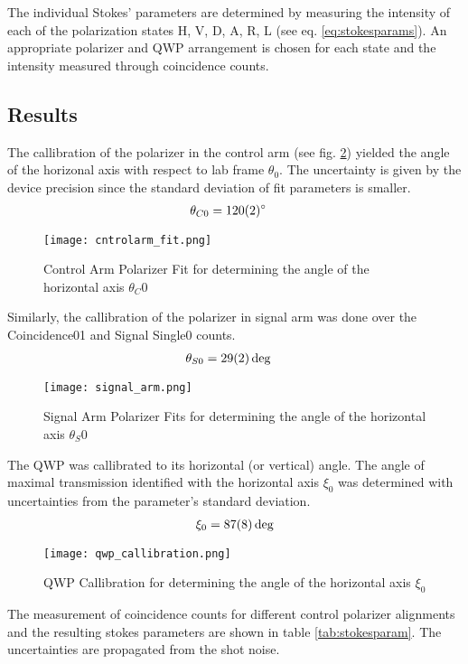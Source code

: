 \documentclass[12pt,a4paper]{article} %
\begin{document}
The individual Stokes' parameters are determined by measuring the intensity of each of the polarization states H, V, D, A, R, L (see eq. \ref{eq:stokesparams}). An appropriate polarizer and QWP arrangement is chosen for each state and the intensity measured through coincidence counts. 

\subsection{Results}
The callibration of the polarizer in the control arm (see fig. \ref{fig:control_cos_squared}) yielded the angle of the horizonal axis with respect to lab frame $\theta_0$. The uncertainty is given by the device precision since the standard deviation of fit parameters is smaller.
\begin{align*}
    \theta_{C0} &= \qty{120 \pm 2}{\degree}
\end{align*}
\begin{figure}[h]
    \centering
    \texttt{[image: cntrolarm\_fit.png]}
    \caption{Control Arm Polarizer Fit for determining the angle of the horizontal axis $\theta_C0$}
    \label{fig:control_cos_squared}
\end{figure}
Similarly, the callibration of the polarizer in signal arm was done over the Coincidence01 and Signal Single0 counts.
\begin{align*}
    \theta_{S0} &= \qty{29 \pm 2}{\deg}
\end{align*}
\begin{figure}[h]
    \centering
    \texttt{[image: signal\_arm.png]}
    \caption{Signal Arm Polarizer Fits for determining the angle of the horizontal axis $\theta_S0$}
    \label{fig:control_cos_squared}
\end{figure}
The QWP was callibrated to its horizontal (or vertical) angle.
The angle of maximal transmission identified with the horizontal axis $\xi_0$ was determined with uncertainties from the parameter's standard deviation.
\begin{align*}
    \xi_0 = \qty{87 \pm 8}{\deg}
\end{align*}
\begin{figure}[h]
    \centering
    \texttt{[image: qwp\_callibration.png]}
    \caption{QWP Callibration for determining the angle of the horizontal axis $\xi_0$}
    \label{fig:signalpolarizer fit}
\end{figure}
The measurement of coincidence counts for different control polarizer alignments and the resulting stokes parameters are shown in table \ref{tab:stokesparam}. The uncertainties are propagated from the shot noise.
\end{document}
